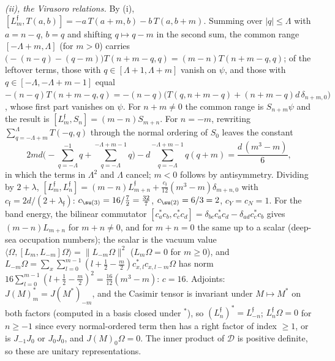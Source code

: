 \emph{(ii), the Virasoro relations.} By (i), $[L^{\mathfrak{f}}_{m}, T(a, b)] = -a\,T(a + m, b) - b\,T(a, b + m)$. Summing over $|q| \le \Lambda$ with $a = n - q$, $b = q$ and shifting $q \mapsto q - m$ in the second sum, the common range $[-\Lambda + m, \Lambda]$ (for $m > 0$) carries $\big(-(n - q) - (q - m)\big)T(n + m - q, q) = (m - n)T(n + m - q, q)$; of the leftover terms, those with $q \in [\Lambda + 1, \Lambda + m]$ vanish on $\psi$, and those with $q \in [-\Lambda, -\Lambda + m - 1]$ equal $-(n - q)T(n + m - q, q) = -(n - q)\big(T(q, n + m - q) + (n + m - q)d\,\delta_{n+m,0}\big)$, whose first part vanishes on $\psi$. For $n + m \ne 0$ the common range is $S_{n+m}\psi$ and the result is $[L^{\mathfrak{f}}_{m}, S_{n}] = (m - n)S_{m+n}$. For $n = -m$, rewriting $\sum_{q=-\Lambda+m}^{\Lambda}T(-q, q)$ through the normal ordering of $S_{0}$ leaves the constant
\[
2md\Big(-\sum_{q=-\Lambda}^{-1}q + \sum_{q=-\Lambda}^{-\Lambda+m-1}q\Big) - d\sum_{q=-\Lambda}^{-\Lambda+m-1}q(q + m) = \frac{d\,(m^{3} - m)}{6},
\]
in which the terms in $\Lambda^{2}$ and $\Lambda$ cancel; $m < 0$ follows by antisymmetry. Dividing by $2 + \lambda$, $[L^{\mathfrak{f}}_{m}, L^{\mathfrak{f}}_{n}] = (m - n)L^{\mathfrak{f}}_{m+n} + \tfrac{c_{\mathfrak{f}}}{12}(m^{3} - m)\delta_{m+n,0}$ with $c_{\mathfrak{f}} = 2d/(2 + \lambda_{\mathfrak{f}})$: $c_{\su(3)} = 16/\tfrac72 = \tfrac{32}{7}$, $c_{\su(2)} = 6/3 = 2$, $c_{Y} = c_{N} = 1$. For the band energy, the bilinear commutator $[c^{*}_{a}c_{b}, c^{*}_{c}c_{d}] = \delta_{bc}c^{*}_{a}c_{d} - \delta_{ad}c^{*}_{c}c_{b}$ gives $(m - n)L_{m+n}$ for $m + n \ne 0$, and for $m + n = 0$ the same up to a scalar (deep-sea occupation numbers); the scalar is the vacuum value $\langle\Omega, [L_{m}, L_{-m}]\Omega\rangle = \|L_{-m}\Omega\|^{2}$ ($L_{m}\Omega = 0$ for $m \ge 0$), and $L_{-m}\Omega = \sum_{x}\sum_{l=0}^{m-1}(l + \tfrac12 - \tfrac{m}{2})c^{*}_{x,l}c_{x,l-m}\Omega$ has norm $16\sum_{l=0}^{m-1}(l + \tfrac12 - \tfrac{m}{2})^{2} = \tfrac{16}{12}(m^{3} - m)$: $c = 16$. Adjoints: $J(M)_{m}^{*} = J(M^{*})_{-m}$, and the Casimir tensor is invariant under $M \mapsto M^{*}$ on both factors (computed in a basis closed under $^{*}$), so $(L^{\mathfrak{f}}_{n})^{*} = L^{\mathfrak{f}}_{-n}$; $L^{\mathfrak{f}}_{n}\Omega = 0$ for $n \ge -1$ since every normal-ordered term then has a right factor of index $\ge 1$, or is $J_{-1}J_{0}$ or $J_{0}J_{0}$, and $J(M)_{0}\Omega = 0$. The inner product of $\mathcal{D}$ is positive definite, so these are unitary representations.

